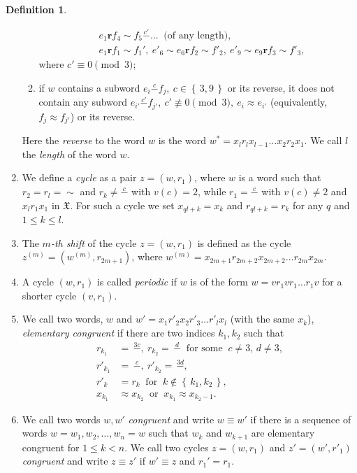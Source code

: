 \documentclass[12pt,a4paper]{amsart}
\theoremstyle{definition}
\newtheorem{defin}[theorem]{Definition}
\theoremstyle{remark}
\numberwithin{equation}{section}
\begin{document}
\begin{defin}
\begin{enumerate}
\begin{enumerate}
\begin{align*}
	& e_1{\mathbf r} f_4\sim f_5{\stackrel{{c'}}{-}}\dots\ \text{ (of any length)},\\
	& e_1{\mathbf r} f_1\sim f_1',\ e'_6\sim e_6{\mathbf r} f_2\sim f'_2,\ e'_9\sim
	e_9{\mathbf r} f_3\sim f'_3, 
      \end{align*}
      where $c'\equiv0\pmod3$;
      \item if $w$ contains a subword $e_i{\stackrel{{c}}{-}}f_j,\ c\in{\left\{\,{3,9}\,\right\}}$
      or its reverse, it does not contain any subword
      $e_{i'}{\stackrel{{c'}}{-}}f_{j'},\ c'\not\equiv0\pmod3,\ e_i\approx e_{i'}$
      (equivalently, $f_j\approx f_{j'}$) or its reverse. 
    \end{enumerate}
    Here the \emph{reverse} to the word $w$ is the word
    $w^*=x_l r_l x_{l-1}\dots x_2r_2x_1$. We call $l$ the
    \emph{length} of the word $w$.
    \item We define a \emph{cycle} as a pair $z=(w,r_1)$, where $w$ is a
    word such that $r_2=r_l=\sim$ and $r_k\ne{\stackrel{{c}}{-}}$ with $v(c)=2$,
    while $r_1={\stackrel{{c}}{-}}$ with $v(c)\ne2$ and $x_lr_1x_1$ in ${\mathfrak X}$. For
    such a cycle we set $x_{ql+k}=x_k$ and $r_{ql+k}=r_k$ for any $q$
    and $1\le k\le l$.
     \item  The \emph{$m$-th shift} of the cycle $z=(w,r_1)$ is defined
     as the cycle $z^{(m)}=(w^{(m)},r_{2m+1})$, where
     $w^{(m)}=x_{2m+1}r_{2m+2}x_{2m+2}\dots r_{2m}x_{2m}$.
     \item  A cycle $(w,r_1)$ is called \emph{periodic} if $w$ is
     of the form $w=vr_1vr_1\dots r_1v$ for a shorter cycle $(v,r_1)$.  
    \item  We call two words, $w$ and
    $w'=x_1r'_2x_2r'_3\dots r'_lx_l$ (with the same $x_k$),
    \emph{elementary congruent} if there are two indices $k_1,k_2$ such
    that 
    \begin{align*}
      r_{k_1}&=\,{\stackrel{{3c}}{-}},\ r_{k_2}=\,{\stackrel{{d}}{-}}\ \text{ for some }\
      c\ne3,\,d\ne3,\\ 
      r'_{k_1}&=\,{\stackrel{{c}}{-}},\  r'_{k_2}=\,{\stackrel{{3d}}{-}},\\
      r'_k&=r_k\ \text{ for }\ k\notin{\left\{\,{k_1,k_2}\,\right\}},\\
      x_{k_1}&\approx x_{k_2}\ \text{ or }\ x_{k_1}\approx x_{k_2-1}.
    \end{align*}
     \item  We call two words $w,w'$ \emph{congruent}
     and write $w\equiv w'$ if there is a sequence of words
      $w=w_1,w_2,\dots,w_n=w$ such that $w_k$
     and $w_{k+1}$ are elementary congruent for $1\le k<n$. We call two
     cycles $z=(w,r_1)$ and $z'=(w',r'_1)$ \emph{congruent} and write
     $z\equiv z'$ if $w'\equiv z$ and $r_1'=r_1$.
    \end{enumerate}     
  \end{defin}
\end{document}
